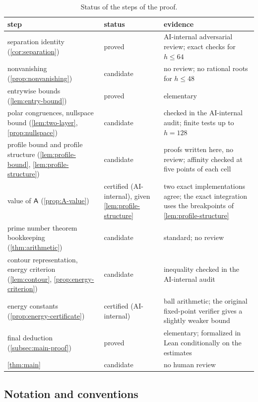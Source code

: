 \begin{table}[ht]
\centering
\small
\begin{tabular}{@{}>{\raggedright\arraybackslash}p{}>{\raggedright\arraybackslash}p{}>{\raggedright\arraybackslash}p{}@{}}
\toprule
step & status & evidence\\
\midrule
separation identity (\cref{cor:separation}) & proved & AI-internal adversarial review; exact checks for $h\le64$\\
nonvanishing (\cref{prop:nonvanishing}) & candidate & no review; no rational roots for $h\le48$\\
entrywise bounds (\cref{lem:entry-bound}) & proved & elementary\\
polar congruences, nullspace bound (\cref{lem:two-layer}, \cref{prop:nullspace}) & candidate & checked in the AI-internal audit; finite tests up to $h=128$\\
profile bound and profile structure (\cref{lem:profile-bound}, \cref{lem:profile-structure}) & candidate & proofs written here, no review; affinity checked at five points of each cell\\
value of $\mathsf{A}$ (\cref{prop:A-value}) & certified (AI-internal), given \cref{lem:profile-structure} & two exact implementations agree; the exact integration uses the breakpoints of \cref{lem:profile-structure}\\
prime number theorem bookkeeping (\cref{thm:arithmetic}) & candidate & standard; no review\\
contour representation, energy criterion (\cref{lem:contour}, \cref{prop:energy-criterion}) & candidate & inequality checked in the AI-internal audit\\
energy constants (\cref{prop:energy-certificate}) & certified (AI-internal) & ball arithmetic; the original fixed-point verifier gives a slightly weaker bound\\
final deduction (\cref{subsec:main-proof}) & proved & elementary; formalized in Lean conditionally on the estimates\\
\midrule
\cref{thm:main} & candidate & no human review\\
\bottomrule
\end{tabular}
\caption{Status of the steps of the proof.}
\label{tab:status}
\end{table}

\subsection{Notation and conventions}\label{subsec:notation}

